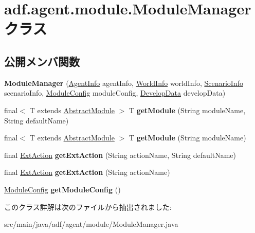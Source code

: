 \hypertarget{classadf_1_1agent_1_1module_1_1ModuleManager}{}\section{adf.\+agent.\+module.\+Module\+Manager クラス}
\label{classadf_1_1agent_1_1module_1_1ModuleManager}
\subsection*{公開メンバ関数}
\begin{DoxyCompactItemize}
\item 
\hypertarget{classadf_1_1agent_1_1module_1_1ModuleManager_ac16f2c9e14069d9b77054a12e5b58b15}{}\label{classadf_1_1agent_1_1module_1_1ModuleManager_ac16f2c9e14069d9b77054a12e5b58b15} 
{\bfseries Module\+Manager} (\hyperlink{classadf_1_1agent_1_1info_1_1AgentInfo}{Agent\+Info} agent\+Info, \hyperlink{classadf_1_1agent_1_1info_1_1WorldInfo}{World\+Info} world\+Info, \hyperlink{classadf_1_1agent_1_1info_1_1ScenarioInfo}{Scenario\+Info} scenario\+Info, \hyperlink{classadf_1_1agent_1_1config_1_1ModuleConfig}{Module\+Config} module\+Config, \hyperlink{classadf_1_1agent_1_1develop_1_1DevelopData}{Develop\+Data} develop\+Data)
\item 
\hypertarget{classadf_1_1agent_1_1module_1_1ModuleManager_ae5bfff73dd4e1a9a70add9a92df5135b}{}\label{classadf_1_1agent_1_1module_1_1ModuleManager_ae5bfff73dd4e1a9a70add9a92df5135b} 
final$<$ T extends \hyperlink{classadf_1_1component_1_1module_1_1AbstractModule}{Abstract\+Module} $>$ T {\bfseries get\+Module} (String module\+Name, String default\+Name)
\item 
\hypertarget{classadf_1_1agent_1_1module_1_1ModuleManager_a97f961775277112b300c281b55b2571f}{}\label{classadf_1_1agent_1_1module_1_1ModuleManager_a97f961775277112b300c281b55b2571f} 
final$<$ T extends \hyperlink{classadf_1_1component_1_1module_1_1AbstractModule}{Abstract\+Module} $>$ T {\bfseries get\+Module} (String module\+Name)
\item 
\hypertarget{classadf_1_1agent_1_1module_1_1ModuleManager_a3f0a47b5d48381227842734b20fc2aee}{}\label{classadf_1_1agent_1_1module_1_1ModuleManager_a3f0a47b5d48381227842734b20fc2aee} 
final \hyperlink{classadf_1_1component_1_1extaction_1_1ExtAction}{Ext\+Action} {\bfseries get\+Ext\+Action} (String action\+Name, String default\+Name)
\item 
\hypertarget{classadf_1_1agent_1_1module_1_1ModuleManager_a6c4b4d88631190f3d7f2254918d934fa}{}\label{classadf_1_1agent_1_1module_1_1ModuleManager_a6c4b4d88631190f3d7f2254918d934fa} 
final \hyperlink{classadf_1_1component_1_1extaction_1_1ExtAction}{Ext\+Action} {\bfseries get\+Ext\+Action} (String action\+Name)
\item 
\hypertarget{classadf_1_1agent_1_1module_1_1ModuleManager_aea388134b8a03bf6237eb5874da9e095}{}\label{classadf_1_1agent_1_1module_1_1ModuleManager_aea388134b8a03bf6237eb5874da9e095} 
\hyperlink{classadf_1_1agent_1_1config_1_1ModuleConfig}{Module\+Config} {\bfseries get\+Module\+Config} ()
\end{DoxyCompactItemize}


このクラス詳解は次のファイルから抽出されました\+:\begin{DoxyCompactItemize}
\item 
src/main/java/adf/agent/module/Module\+Manager.\+java\end{DoxyCompactItemize}
